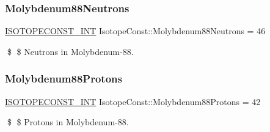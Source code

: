 \subsubsection{\texorpdfstring{Molybdenum88\+Neutrons}{Molybdenum88Neutrons}}
{\footnotesize\ttfamily \mbox{\hyperlink{group___isotope_const-_macros_ga5f18360b3e99483a35c32d789e62621c}{I\+S\+O\+T\+O\+P\+E\+C\+O\+N\+S\+T\+\_\+\+I\+NT}} Isotope\+Const\+::\+Molybdenum88\+Neutrons = 46}

\$ \$ Neutrons in Molybdenum-\/88. \mbox{\label{group___isotope_const-_molybdenum-_mo88_gaee05d61cd7919875208b8f663c99e134}} 
\subsubsection{\texorpdfstring{Molybdenum88\+Protons}{Molybdenum88Protons}}
{\footnotesize\ttfamily \mbox{\hyperlink{group___isotope_const-_macros_ga5f18360b3e99483a35c32d789e62621c}{I\+S\+O\+T\+O\+P\+E\+C\+O\+N\+S\+T\+\_\+\+I\+NT}} Isotope\+Const\+::\+Molybdenum88\+Protons = 42}

\$ \$ Protons in Molybdenum-\/88. 